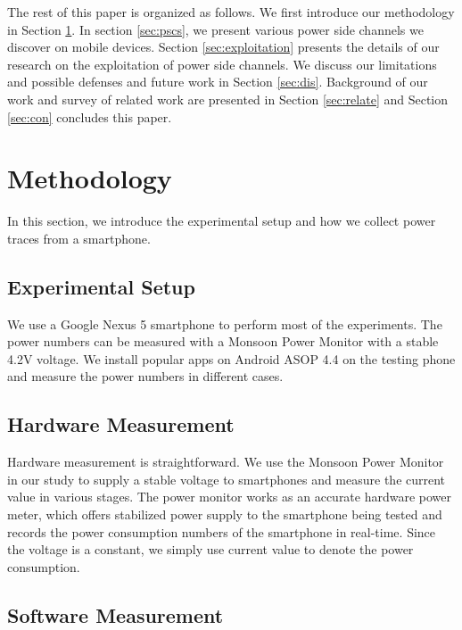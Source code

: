 \documentclass{sig-alternate}
\begin{document}
     
The rest of this paper is organized as follows. We first introduce our methodology in Section \ref{sec:method}. In section \ref{sec:pscs}, we present various power side channels we discover on mobile devices. Section \ref{sec:exploitation} presents the details of our research on the exploitation of  power side channels. We discuss our limitations and possible defenses and future work in Section \ref{sec:dis}. Background of our work and survey of related work are presented in Section \ref{sec:relate} and Section \ref{sec:con} concludes this paper.



\section{Methodology}
\label{sec:method}

In this section, we introduce the experimental setup and how we collect power traces from a smartphone.

\subsection{Experimental Setup}

We use a Google Nexus 5 smartphone to perform most of the experiments. The power numbers can be measured with a Monsoon Power Monitor with a stable 4.2V voltage. We install popular apps on Android ASOP 4.4 on the testing phone and measure the power numbers in different cases.


\subsection{Hardware Measurement}

Hardware measurement is straightforward. We use the Monsoon Power Monitor~\cite{monsoonPM} in our study to supply a stable voltage to smartphones and measure the current value in various stages. The power monitor works as an accurate hardware power meter, which offers stabilized power supply to the smartphone being tested and records the power consumption numbers of the smartphone in real-time. Since the voltage is a constant, we simply use current value to denote the power consumption.







\subsection{Software Measurement}
\label{sec:softmethod}
\end{document}
